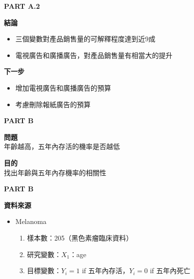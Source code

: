 \documentclass[12pt,aspectratio=43]{beamer}
\begin{document}
\begin{frame}[t]{\textbf{PART A.2}}
\vspace*{10pt}
{\Large \setlength{\baselineskip}{20pt} \parbox{\linewidth}{\raggedright \textbf{結論}}}
\begin{itemize}
\setlength{\itemsep}{10pt}
\item 三個變數對產品銷售量的可解釋程度達到近9成
\item 電視廣告和廣播廣告，對產品銷售量有相當大的提升
\end{itemize}
\vspace*{30pt}

{\Large \setlength{\baselineskip}{20pt} \parbox{\linewidth}{\raggedright \textbf{下一步}}}
\begin{itemize}
\setlength{\itemsep}{10pt}
\item 增加電視廣告和廣播廣告的預算
\item 考慮刪除報紙廣告的預算
\end{itemize}
\textbf{}

\end{frame}

\begin{frame}[t]{\textbf{PART B}}
\vspace*{10pt}

{
\setlength{\baselineskip}{1.5\baselineskip}
{
\Large
\parbox{\linewidth}{\raggedright \textbf{問題}\\
年齡越高，五年內存活的機率是否越低}
}

\vspace*{2cm}

{
\Large \parbox{\linewidth}{\raggedright \textbf{目的}\\
找出年齡與五年內存機率的相關性}
}
}
\end{frame}

\begin{frame}[t]{\textbf{PART B}} 
\vspace*{10pt}
{
\setlength{\baselineskip}{1.3\baselineskip}   %
{
\Large
\parbox{\linewidth}{\raggedright \textbf{資料來源}}
}
}

\begin{itemize}
    \item Melanoma
  \begin{enumerate}[]
    \setlength{\itemsep}{6pt}
    \item 樣本數：205（黑色素瘤臨床資料）
    \item 研究變數：$X_1$：age
    \item 目標變數：$Y_i=1$ if 五年內存活，$Y_i=0$ if 五年內死亡
  \end{enumerate}
\end{itemize}

\end{frame}
\end{document}
